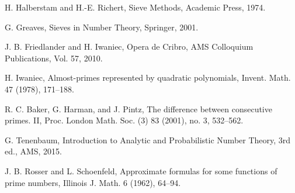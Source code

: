 \documentclass[12pt]{article}
\theoremstyle{remark}
\begin{document}
\begin{thebibliography}{99}
H. Halberstam and H.-E. Richert, Sieve Methods, Academic Press, 1974.

G. Greaves, Sieves in Number Theory, Springer, 2001.

J. B. Friedlander and H. Iwaniec, Opera de Cribro, AMS Colloquium Publications, Vol. 57, 2010.

H. Iwaniec, Almost-primes represented by quadratic polynomials, Invent. Math. 47 (1978), 171--188.

R. C. Baker, G. Harman, and J. Pintz, The difference between consecutive primes. II, Proc. London Math. Soc. (3) 83 (2001), no. 3, 532--562.

G. Tenenbaum, Introduction to Analytic and Probabilistic Number Theory, 3rd ed., AMS, 2015.

J. B. Rosser and L. Schoenfeld, Approximate formulas for some functions of prime numbers, Illinois J. Math. 6 (1962), 64--94.

\end{thebibliography}
\end{document}
